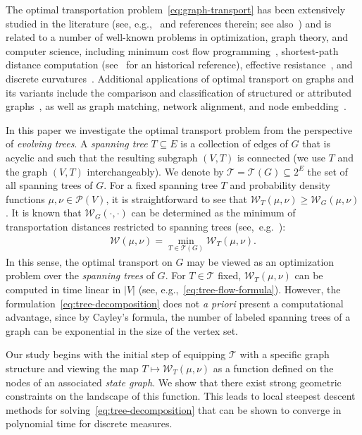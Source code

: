 \documentclass[11pt,a4paper]{article}
\newcommand{\prob}{{\mathscr{P}}}
\newcommand{\wass}{{\mathcal{W}}}
\newcommand{\setoftrees}{{\mathcal{T}}}
\newcommand{\hlc}[2][yellow]{{%
		\colorlet{foo}{#1}%
		\sethlcolor{foo}\hl{#2}}%
}
\newcommand{\fan}[1] {{ \textcolor{red}{\hlc[red!15]{\sf [Fan:] #1}}}}
\begin{document}
    The optimal transportation problem~\cref{eq:graph-transport} has been extensively studied in the literature (see, e.g.,~\cite[Ch. 6]{peyre2019computational} and references therein; see also~\cite{essid2018quadratically}) and is related to a number of well-known problems in optimization, graph theory, and computer science, including minimum cost flow programming~\cite{orlin1993faster}, shortest-path distance computation (see~\cite{dijkstra1959note} for an historical reference), effective resistance~\cite{robertson2024all}, and discrete curvatures~\cite{lin2011ricci}. Additional applications of optimal transport on graphs and its variants include the comparison and classification of structured or attributed graphs~\cite{titouan2019optimal,togninalli2019wasserstein}, as well as graph matching, network alignment, and node embedding~\cite{xu2019gromov}.

    In this paper we investigate the optimal transport problem from the perspective of \emph{evolving trees}. A \emph{spanning tree} $T\subseteq E$ is a collection of edges of $G$ that is acyclic and such that the resulting subgraph $(V,T)$ is connected (we use $T$ and the graph $(V,T)$ interchangeably). We denote by $\setoftrees=\setoftrees(G)\subseteq 2^{E}$ the set of all spanning trees of $G$. For a fixed spanning tree $T$ and probability density functions $\mu,\nu\in\prob(V)$, it is straightforward to see that $\wass_{T}(\mu,\nu)\ge \wass_{G}(\mu,\nu)$. It is known that $\wass_G(\cdot,\cdot)$ can be determined as the minimum of transportation distances restricted to spanning trees (see,~e.g.~\cite{montrucchio2022kantorovich}):
        \begin{align}\label{eq:tree-decomposition}
            \wass(\mu,\nu)=\min_{T\in\mathcal{T}(G)}\wass_T(\mu,\nu).
        \end{align}
    In this sense, the optimal transport on $G$ may be viewed as an optimization problem over the \emph{spanning trees} of $G$. For $T\in\setoftrees$ fixed, $\wass_T(\mu,\nu)$ can be computed in time linear in $|V|$ (see, e.g.,~\cref{eq:tree-flow-formula}). However, the formulation~\cref{eq:tree-decomposition} does not \emph{a priori} present a computational advantage, since by Cayley's formula, the number of labeled spanning trees of a graph can be exponential in the size of the vertex set.

    Our study begins with the initial step of equipping $\setoftrees$ with a specific graph structure and viewing the map $T\mapsto \wass_T(\mu,\nu)$ as a function defined on the nodes of an associated \emph{state graph}. We show that there exist strong geometric constraints on the landscape of this function. This leads to local steepest descent methods for solving~\cref{eq:tree-decomposition} that can be shown to converge in polynomial time for discrete measures.
\end{document}
